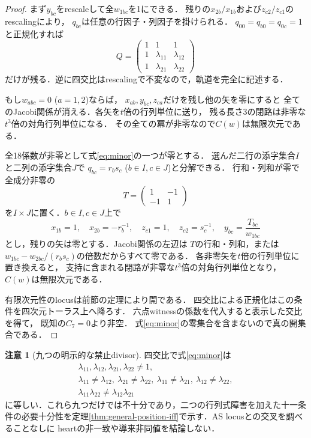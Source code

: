 \documentclass[11pt,a4paper]{ltjsarticle}
\theoremstyle{definition}\newtheorem{remark}[theorem]{注意}
\begin{document}
\begin{proof}
まず$y_{bc}$をrescaleして全$w_{1bc}$を1にできる．
残りの$x_{2b}/x_{1b}$および$z_{c2}/z_{c1}$のrescalingにより，
$q_{bc}$は任意の行因子・列因子を掛けられる．
$q_{00}=q_{b0}=q_{0c}=1$と正規化すれば
\[
Q=\begin{pmatrix}1&1&1\\1&\lambda_{11}&\lambda_{12}\\
1&\lambda_{21}&\lambda_{22}\end{pmatrix}
\]
だけが残る．逆に四交比はrescalingで不変なので，軌道を完全に記述する．

もし$w_{abc}=0$ ($a=1,2$)ならば，
$x_{ab},y_{bc},z_{ca}$だけを残し他の矢を零にすると
全てのJacobi関係が消える．各矢を$t$倍の行列単位に送り，
残る長さ3の閉路は非零な$t^3$倍の対角行列単位になる．
その全ての冪が非零なので$C(w)$は無限次元である．

全18係数が非零として式\eqref{eq:minor}の一つが零とする．
選んだ二行の添字集合$I$と二列の添字集合$J$で
$q_{bc}=r_bs_c$ ($b\in I,c\in J$)と分解できる．
行和・列和が零で全成分非零の
\[
T=\begin{pmatrix}1&-1\\-1&1\end{pmatrix}
\]
を$I\times J$に置く．$b\in I,c\in J$上で
\[
x_{1b}=1,\quad x_{2b}=-r_b^{-1},\quad
z_{c1}=1,\quad z_{c2}=s_c^{-1},\quad
y_{bc}=\frac{T_{bc}}{w_{1bc}}
\]
とし，残りの矢は零とする．Jacobi関係の左辺は
$T$の行和・列和，または
$w_{1bc}-w_{2bc}/(r_bs_c)$の倍数だからすべて零である．
各非零矢を$t$倍の行列単位に置き換えると，
支持に含まれる閉路が非零な$t^3$倍の対角行列単位となり，
$C(w)$は無限次元である．

有限次元性のlocusは前節の定理により開である．
四交比による正規化はこの条件を四次元トーラス上へ降ろす．
六点witnessの係数を代入すると表示した交比を得て，
既知の$C_7=0$より非空．
式\eqref{eq:minor}の零集合を含まないので真の開集合である．
\end{proof}

\begin{remark}[九つの明示的な禁止divisor]
四交比で式\eqref{eq:minor}は
\[
\begin{gathered}
\lambda_{11},\lambda_{12},\lambda_{21},\lambda_{22}\ne1,\\
\lambda_{11}\ne\lambda_{12},\ 
\lambda_{21}\ne\lambda_{22},\
\lambda_{11}\ne\lambda_{21},\
\lambda_{12}\ne\lambda_{22},\\
\lambda_{11}\lambda_{22}\ne\lambda_{12}\lambda_{21}
\end{gathered}
\]
に等しい．これら九つだけでは不十分であり，二つの行列式障害を加えた十一条件の必要十分性を定理\ref{thm:general-position-iff}で示す．AS locusとの交叉を調べることなしに
heartの非一致や導来非同値を結論しない．
\end{remark}




\end{document}
